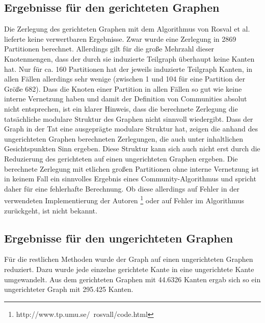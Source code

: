 \subsection{Ergebnisse für den gerichteten Graphen}
\label{sec:ergebnisse-fur-den}

Die Zerlegung des gerichteten Graphen mit dem Algorithmus von Rosval
et al. lieferte keine verwertbaren Ergebnisse. Zwar wurde eine
Zerlegung in 2869 Partitionen berechnet. Allerdings gilt für die
große Mehrzahl dieser Knotenmengen, dass der durch sie induzierte
Teilgraph überhaupt keine Kanten hat. Nur für ca. 160 Partitionen
hat der jeweils induzierte Teilgraph Kanten, in allen Fällen
allerdings sehr wenige (zwischen 1 und 104 für eine Partition der
Größe 682). Dass die Knoten einer Partition in allen Fällen so
gut wie keine interne Vernetzung haben und damit der Definition von
Communities absolut nicht entsprechen, ist ein klarer Hinweis, dass
die berechnete Zerlegung die tatsächliche modulare Struktur des
Graphen nicht sinnvoll wiedergibt. Dass der Graph in der Tat eine
ausgeprägte modulare Struktur hat, zeigen die anhand des
ungerichteten Graphen berechneten Zerlegungen, die auch unter
inhaltlichen Gesichtspunkten Sinn ergeben. Diese Struktur kann sich
auch nicht erst durch die Reduzierung des gerichteten auf einen
ungerichteten Graphen ergeben. Die berechnete Zerlegung mit etlichen
großen Partitionen ohne interne Vernetzung ist in keinem Fall ein
sinnvolles Ergebnis eines Community-Algorithmus und spricht daher
für eine fehlerhafte Berechnung. Ob diese allerdings auf Fehler in
der verwendeten Implementierung der Autoren
\footnote{http://www.tp.umu.se/~rosvall/code.html} oder auf Fehler im
Algorithmus zurückgeht, ist nicht bekannt.

\subsection{Ergebnisse für den ungerichteten Graphen}
\label{sec:ergebnisse-fur-den-1}

Für die restlichen Methoden wurde der Graph auf einen ungerichteten
Graphen reduziert. Dazu wurde jede einzelne gerichtete Kante in eine
ungerichtete Kante umgewandelt. Aus dem gerichteten Graphen mit 44.6326
Kanten ergab sich so ein ungerichteter Graph mit 295.425 Kanten.

